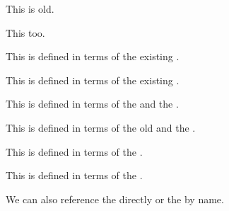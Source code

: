 \documentclass[minimal]{omdoc}
\begin{document}
\begin{module}[id=foo]
  \begin{definition}[id=test.one]
    This  is old.

    This  too.
  \end{definition}

  \begin{definition}
    This  is defined in terms of the existing .

    This  is defined in terms of the existing .
  \end{definition}

  \begin{definition}
    This  is defined in terms of the  and the 
    . 

    This  is defined in terms of the old
     and the .
  \end{definition}

  \begin{definition}
    This  is defined in terms of the
    .
    
    This  is defined in terms of the
    .
  \end{definition}
  We can also reference the  directly or the
  by name.
\end{module}
\end{document}
